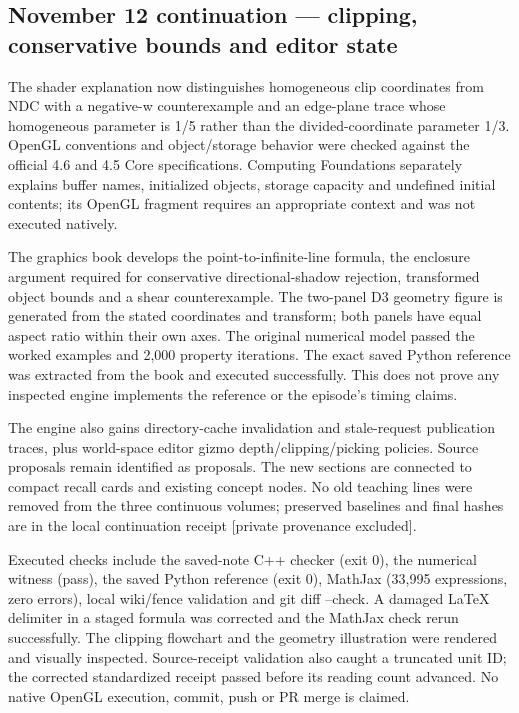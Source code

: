 \subsection{November 12 continuation --- clipping, conservative bounds and editor state}\label{appendix-a103e7846d21-november-12-continuation-clipping-conservative-bounds-and-editor-state}

The shader explanation now distinguishes homogeneous clip coordinates from NDC with a negative-w counterexample and an edge-plane trace whose homogeneous parameter is 1/5 rather than the divided-coordinate parameter 1/3. OpenGL conventions and object/storage behavior were checked against the official 4.6 and 4.5 Core specifications. Computing Foundations separately explains buffer names, initialized objects, storage capacity and undefined initial contents; its OpenGL fragment requires an appropriate context and was not executed natively.

The graphics book develops the point-to-infinite-line formula, the enclosure argument required for conservative directional-shadow rejection, transformed object bounds and a shear counterexample. The two-panel D3 geometry figure is generated from the stated coordinates and transform; both panels have equal aspect ratio within their own axes. The original numerical model passed the worked examples and 2,000 property iterations. The exact saved Python reference was extracted from the book and executed successfully. This does not prove any inspected engine implements the reference or the episode's timing claims.

The engine also gains directory-cache invalidation and stale-request publication traces, plus world-space editor gizmo depth/clipping/picking policies. Source proposals remain identified as proposals. The new sections are connected to compact recall cards and existing concept nodes. No old teaching lines were removed from the three continuous volumes; preserved baselines and final hashes are in the local {continuation receipt {[}private provenance excluded{]}}.

Executed checks include the saved-note C++ checker (exit 0), the numerical witness (pass), the saved Python reference (exit 0), MathJax (33,995 expressions, zero errors), local wiki/fence validation and git diff --check. A damaged LaTeX delimiter in a staged formula was corrected and the MathJax check rerun successfully. The clipping flowchart and the geometry illustration were rendered and visually inspected. Source-receipt validation also caught a truncated unit ID; the corrected standardized receipt passed before its reading count advanced. No native OpenGL execution, commit, push or PR merge is claimed.

